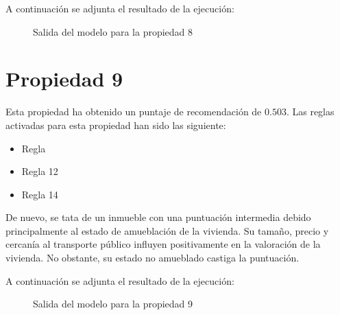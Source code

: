 \documentclass[12pt]{report} %
\begin{document}
    A continuación se adjunta el resultado de la ejecución:
    \begin{figure}[H]
        \centering
        \caption{Salida del modelo para la propiedad 8}
    \end{figure}

    \section{Propiedad 9}
    Esta propiedad ha obtenido un puntaje de recomendación de $0.503$. Las
    reglas activadas para esta propiedad han sido las siguiente:
    \begin{itemize}
        \item Regla 
        \item Regla 12
        \item Regla 14
    \end{itemize}
    
    De nuevo, se tata de un inmueble con una puntuación intermedia debido
    principalmente al estado de amueblación de la vivienda. Su tamaño, precio y
    cercanía al transporte público influyen positivamente en la valoración de
    la vivienda. No obstante, su estado no amueblado castiga la puntuación.

    A continuación se adjunta el resultado de la ejecución:
    \begin{figure}[H]
        \centering
        \caption{Salida del modelo para la propiedad 9}
    \end{figure}
\end{document}
